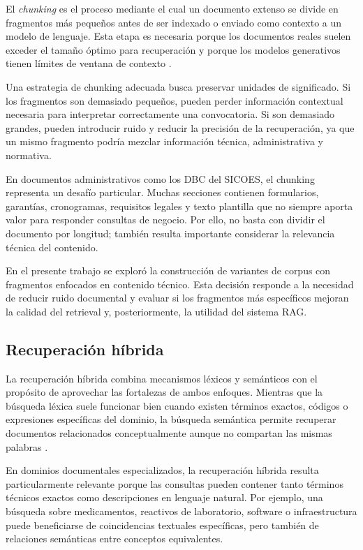 El \textit{chunking} es el proceso mediante el cual un documento extenso se divide en fragmentos más pequeños antes de ser indexado o enviado como contexto a un modelo de lenguaje. Esta etapa es necesaria porque los documentos reales suelen exceder el tamaño óptimo para recuperación y porque los modelos generativos tienen límites de ventana de contexto \parencite{lewis2020retrieval}.

Una estrategia de chunking adecuada busca preservar unidades de significado. Si los fragmentos son demasiado pequeños, pueden perder información contextual necesaria para interpretar correctamente una convocatoria. Si son demasiado grandes, pueden introducir ruido y reducir la precisión de la recuperación, ya que un mismo fragmento podría mezclar información técnica, administrativa y normativa.

En documentos administrativos como los DBC del SICOES, el chunking representa un desafío particular. Muchas secciones contienen formularios, garantías, cronogramas, requisitos legales y texto plantilla que no siempre aporta valor para responder consultas de negocio. Por ello, no basta con dividir el documento por longitud; también resulta importante considerar la relevancia técnica del contenido.

En el presente trabajo se exploró la construcción de variantes de corpus con fragmentos enfocados en contenido técnico. Esta decisión responde a la necesidad de reducir ruido documental y evaluar si los fragmentos más específicos mejoran la calidad del retrieval y, posteriormente, la utilidad del sistema RAG.

\subsection{Recuperación híbrida}

La recuperación híbrida combina mecanismos léxicos y semánticos con el propósito de aprovechar las fortalezas de ambos enfoques. Mientras que la búsqueda léxica suele funcionar bien cuando existen términos exactos, códigos o expresiones específicas del dominio, la búsqueda semántica permite recuperar documentos relacionados conceptualmente aunque no compartan las mismas palabras \parencite{manning2008ir,karpukhin2020dpr}.

En dominios documentales especializados, la recuperación híbrida resulta particularmente relevante porque las consultas pueden contener tanto términos técnicos exactos como descripciones en lenguaje natural. Por ejemplo, una búsqueda sobre medicamentos, reactivos de laboratorio, software o infraestructura puede beneficiarse de coincidencias textuales específicas, pero también de relaciones semánticas entre conceptos equivalentes.

